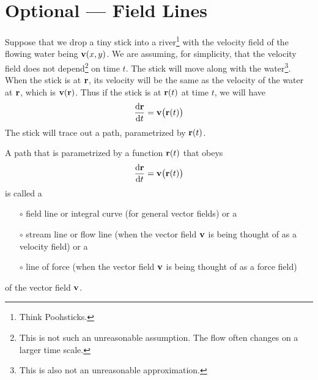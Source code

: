 \section{Optional --- Field Lines}\label{sec:fieldLines}

Suppose that we drop a tiny stick into a river\footnote{Think Poohsticks.
} with the velocity
field of the flowing water being $\mathbf{v}(x,y)$. We are assuming, for 
simplicity, that the velocity field does not depend\footnote{This is not such an unreasonable assumption. The flow often changes on a larger time scale.} 
on time $t$. The stick will move along with the 
water\footnote{This is also not an unreasonable approximation.}. When the stick 
is at $\mathbf{r}$, its velocity will be the same as the velocity of the 
water at $\mathbf{r}$, which is $\mathbf{v}(\mathbf{r})$. Thus if the stick is at 
$\mathbf{r}(t)$ at time $t$, we will have
\begin{equation*}
\diff{\vr}{t} = \vv\big(\vr(t)\big)
\end{equation*}
The stick will trace out a path, parametrized by $\mathbf{r}(t)$. 

\begin{defn}\label{def:fieldLine} 
A path that is parametrized by a function $\mathbf{r}(t)$ that obeys
\begin{equation*}
\diff{\vr}{t} = \vv\big(\vr(t)\big)
\end{equation*}
is called a
\begin{itemize}\itemsep1pt \parskip0pt  %
\item[$\circ$] field line or integral curve (for general vector fields) or a
\item[$\circ$] stream line or flow line (when the vector field $\mathbf{v}$ is
                  being thought of as a velocity field) or a
\item[$\circ$] line of force (when the vector field $\mathbf{v}$ is
                  being thought of as a force field)
\end{itemize}
of the vector field $\mathbf{v}$.
\end{defn}

